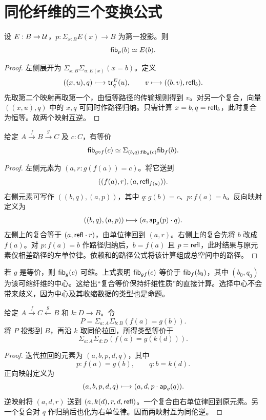 \section{同伦纤维的三个变换公式}

\begin{proposition}[依赖和投影的纤维]
设 $E:B\to\mathcal U$，$p:\Sigma_{x:B}E(x)\to B$ 为第一投影。则
\[
 \mathsf{fib}_p(b)\simeq E(b).
\]
\end{proposition}
\begin{proof}
左侧展开为 $\Sigma_{x:B}\Sigma_{u:E(x)}(x=b)$。定义
\[
 ((x,u),q)\longmapsto\mathsf{tr}^E_q(u),
 \qquad
 v\longmapsto((b,v),\mathsf{refl}_b).
\]
先取第二个映射再取第一个，由恒等路径的传输规则得到 $v$。对另一个复合，向量 $((x,u),q)$ 中的 $x,q$ 可同时作路径归纳。只需计算 $x=b,q=\mathsf{refl}_b$，此时复合为恒等。故两个映射互逆。
\end{proof}

\begin{proposition}[复合映射的纤维]\label{prop:composite-fiber}
给定 $A\xrightarrow f B\xrightarrow g C$ 及 $c:C$，有等价
\[
 \mathsf{fib}_{g\circ f}(c)
 \simeq
 \Sigma_{(b,q):\mathsf{fib}_g(c)}\mathsf{fib}_f(b).
\]
\end{proposition}
\begin{proof}
左侧元素为 $(a,r:g(f(a))=c)$。将它送到
\[
 ((f(a),r),(a,\mathsf{refl}_{f(a)})).
\]
右侧元素可写作 $((b,q),(a,p))$，其中 $q:g(b)=c$、$p:f(a)=b$。反向映射定义为
\[
 ((b,q),(a,p))\longmapsto
 (a,\mathsf{ap}_g(p)\cdot q).
\]
左侧上的复合等于 $(a,\mathsf{refl}\cdot r)$，由单位律回到 $(a,r)$。右侧上的复合先将 $b$ 改成 $f(a)$。对 $p:f(a)=b$ 作路径归纳后，$b=f(a)$ 且 $p=\mathsf{refl}$，此时结果与原元素仅相差路径的左单位律。依赖和的路径公式将该计算组成总空间中的路径。
\end{proof}

\begin{example}
若 $g$ 是等价，则 $\mathsf{fib}_g(c)$ 可缩。上式表明 $\mathsf{fib}_{gf}(c)$ 等价于 $\mathsf{fib}_f(b_0)$，其中 $(b_0,q_0)$ 为该可缩纤维的中心。这给出“复合等价保持纤维性质”的直接计算。选择中心不会带来歧义，因为中心及其收缩数据的类型也是命题。
\end{example}

\begin{proposition}[同伦拉回的粘合]
给定 $A\xrightarrow f C\xleftarrow g B$ 和 $k:D\to B$。令
\[
 P=\Sigma_{a:A}\Sigma_{b:B}(f(a)=g(b)).
\]
将 $P$ 投影到 $B$，再沿 $k$ 取同伦拉回，所得类型等价于
\[
 \Sigma_{a:A}\Sigma_{d:D}(f(a)=g(k(d))).
\]
\end{proposition}
\begin{proof}
迭代拉回的元素为 $(a,b,p,d,q)$，其中
\[
 p:f(a)=g(b),\qquad q:b=k(d).
\]
正向映射定义为
\[
 (a,b,p,d,q)\longmapsto(a,d,p\cdot\mathsf{ap}_g(q)).
\]
逆映射将 $(a,d,r)$ 送到 $(a,k(d),r,d,\mathsf{refl})$。一个复合由右单位律回到原元素。另一个复合对 $q$ 作归纳后也化为右单位律。因而两映射互为同伦逆。
\end{proof}

